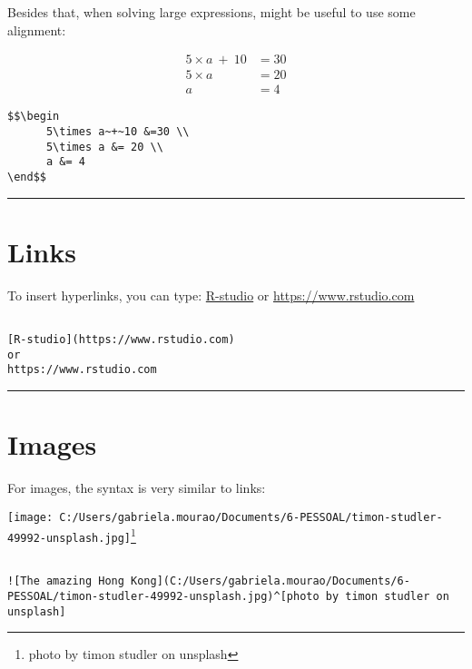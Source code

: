 \documentclass[]{article}
\let\rmarkdownfootnote\footnote%
\def\footnote{\protect\rmarkdownfootnote}
\begin{document}
Besides that, when solving large expressions, might be useful to use
some alignment:

\[\begin{align}
      5\times a~+~10 &=30 \\
      5\times a &= 20 \\
      a &= 4
\end{align}\]

\begin{verbatim}
$$\begin
      5\times a~+~10 &=30 \\
      5\times a &= 20 \\
      a &= 4
\end$$
\end{verbatim}

\begin{center}\rule{0.5\linewidth}{\linethickness}\end{center}

\section{Links}\label{links}

To insert hyperlinks, you can type:
\href{https://www.rstudio.com}{R-studio} or
\url{https://www.rstudio.com}

\begin{verbatim}

[R-studio](https://www.rstudio.com)      
or     
https://www.rstudio.com   

\end{verbatim}

\begin{center}\rule{0.5\linewidth}{\linethickness}\end{center}

\section{Images}\label{images}

For images, the syntax is very similar to links:

\texttt{[image: C:/Users/gabriela.mourao/Documents/6-PESSOAL/timon-studler-49992-unsplash.jpg]}\footnote{photo
  by timon studler on unsplash}

\begin{verbatim}

![The amazing Hong Kong](C:/Users/gabriela.mourao/Documents/6-PESSOAL/timon-studler-49992-unsplash.jpg)^[photo by timon studler on unsplash]  

\end{verbatim}
\end{document}
